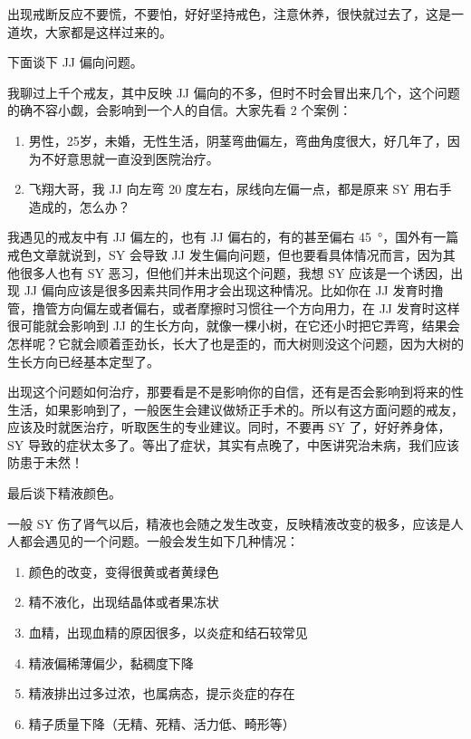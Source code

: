 \documentclass[fontset=founder]{ctexart}
\begin{document}
出现戒断反应不要慌，不要怕，好好坚持戒色，注意休养，很快就过去了，这是一道坎，大家都是这样过来的。

下面谈下 JJ 偏向问题。

我聊过上千个戒友，其中反映 JJ 偏向的不多，但时不时会冒出来几个，这个问题的确不容小觑，会影响到一个人的自信。大家先看 2 个案例：

\begin{enumerate}
    \item 男性，25岁，未婚，无性生活，阴茎弯曲偏左，弯曲角度很大，好几年了，因为不好意思就一直没到医院治疗。
    \item 飞翔大哥，我 JJ 向左弯 20 度左右，尿线向左偏一点，都是原来 SY 用右手造成的，怎么办？
\end{enumerate}

我遇见的戒友中有 JJ 偏左的，也有 JJ 偏右的，有的甚至偏右 \SI{45}{\degree}，国外有一篇戒色文章就说到，SY 会导致 JJ 发生偏向问题，但也要看具体情况而言，因为其他很多人也有 SY 恶习，但他们并未出现这个问题，我想 SY 应该是一个诱因，出现 JJ 偏向应该是很多因素共同作用才会出现这种情况。比如你在 JJ 发育时撸管，撸管方向偏左或者偏右，或者摩擦时习惯往一个方向用力，在 JJ 发育时这样很可能就会影响到 JJ 的生长方向，就像一棵小树，在它还小时把它弄弯，结果会怎样呢？它就会顺着歪劲长，长大了也是歪的，而大树则没这个问题，因为大树的生长方向已经基本定型了。

出现这个问题如何治疗，那要看是不是影响你的自信，还有是否会影响到将来的性生活，如果影响到了，一般医生会建议做矫正手术的。所以有这方面问题的戒友，应该及时就医治疗，听取医生的专业建议。同时，不要再 SY 了，好好养身体，SY 导致的症状太多了。等出了症状，其实有点晚了，中医讲究治未病，我们应该防患于未然！

最后谈下精液颜色。

一般 SY 伤了肾气以后，精液也会随之发生改变，反映精液改变的极多，应该是人人都会遇见的一个问题。一般会发生如下几种情况：

\begin{enumerate}
    \item 颜色的改变，变得很黄或者黄绿色
    \item 精不液化，出现结晶体或者果冻状
    \item 血精，出现血精的原因很多，以炎症和结石较常见
    \item 精液偏稀薄偏少，黏稠度下降
    \item 精液排出过多过浓，也属病态，提示炎症的存在
    \item 精子质量下降（无精、死精、活力低、畸形等）
\end{enumerate}
\end{document}
